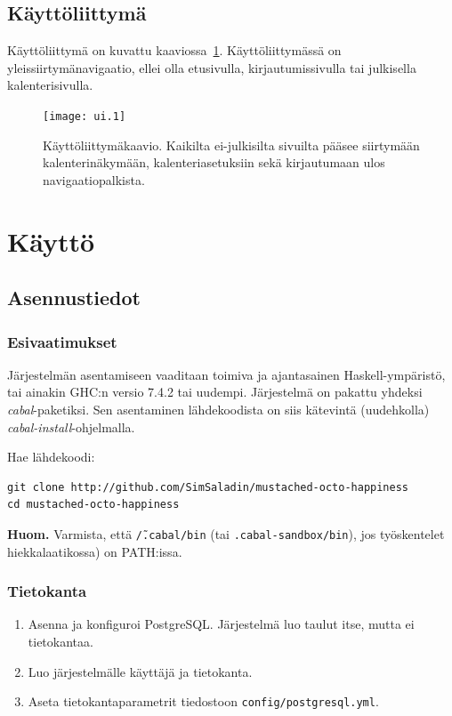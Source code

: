 \documentclass[a4paper,12pt]{report}
\begin{document}
\section{Käyttöliittymä}
Käyttöliittymä on kuvattu kaaviossa~\ref{graph_ui}. Käyttöliittymässä on
yleissiirtymänavigaatio, ellei olla etusivulla, kirjautumissivulla tai
julkisella kalenterisivulla.

\begin{figure}[ht]
   \centering
   \texttt{[image: ui.1]}
   \caption{Käyttöliittymäkaavio. Kaikilta ei-julkisilta sivuilta pääsee
   siirtymään kalenterinäkymään, kalenteriasetuksiin sekä kirjautumaan ulos
   navigaatiopalkista.}
   \label{graph_ui}
\end{figure}

\chapter{Käyttö}
\section{Asennustiedot}

\subsection{Esivaatimukset}

Järjestelmän asentamiseen vaaditaan toimiva ja ajantasainen Haskell-ympäristö,
tai ainakin GHC:n versio 7.4.2 tai uudempi.  Järjestelmä on pakattu yhdeksi
\emph{cabal}-\-paketiksi. Sen asentaminen lähdekoodista on siis kätevintä
(uudehkolla) \emph{cabal-install}-ohjelmalla.

Hae lähdekoodi:
\begin{verbatim}
git clone http://github.com/SimSaladin/mustached-octo-happiness
cd mustached-octo-happiness
\end{verbatim}

\textbf{Huom.} Varmista, että \texttt{\~/.cabal/bin}
(tai \texttt{.cabal-sandbox/bin}), jos työskentelet hiekkalaatikossa) on
PATH:issa.

\subsection{Tietokanta}
\begin{enumerate}
   \item Asenna ja konfiguroi PostgreSQL\@. Järjestelmä luo taulut itse, mutta ei
      tietokantaa.
   \item Luo järjestelmälle käyttäjä ja tietokanta.
   \item Aseta tietokantaparametrit tiedostoon \texttt{config/postgresql.yml}.
\end{enumerate}
\end{document}

